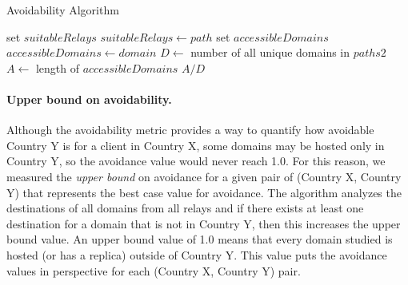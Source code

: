 \begin{algorithm}[t]
\caption{Avoidability Algorithm}
\label{avoid_algo}
\footnotesize
\begin{algorithmic}[1]
    \State set $suitableRelays$
		\State $suitableRelays \gets path$
	\EndIf
    \EndFor
    \State set $accessibleDomains$
        \State $accessibleDomains \gets domain$
        \EndIf
    \EndIf
    \EndFor
    \State $D \gets$ number of all unique domains in $paths2$
    \State $A \gets$ length of $accessibleDomains$
    \State \Return $A / D$
\EndFunction
\end{algorithmic}
\end{algorithm}


\paragraph{Upper bound on avoidability.}  Although the avoidability
metric provides a way to quantify how avoidable Country
Y is for a client in Country X, some
domains may be hosted only in Country Y, so the avoidance value 
would never reach 1.0.  For this reason, we measured the {\em upper
bound} on avoidance for a given pair of (Country X, Country Y) that
represents the best case value for avoidance.  The algorithm analyzes the destinations of all domains from all relays and if there exists at least one destination for a domain that is not in Country Y, then this increases the upper bound value.  An upper bound value of 1.0 means that every domain studied is hosted (or has a replica) outside of Country Y.  This value puts the avoidance values in perspective for each (Country X, Country Y) pair. 


